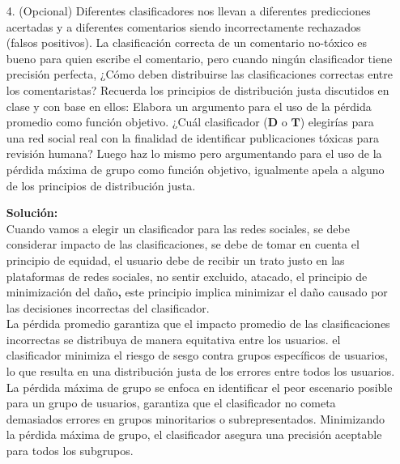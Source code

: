 \documentclass[11pt,letterpaper]{article}
\newenvironment{solution}{%
  \noindent\begin{shaded}
  \textbf{Solución:}\ }{
  \end{shaded}%
}
\begin{document}
\begin{enumerate}
¿Qué clasificador tiene la menor pérdida promedio? ¿Qué clasificador tiene la menor pérdida máxima de grupo?
  \begin{solution}
 
  \end{solution}

  \item [4.]
  (Opcional) Diferentes clasificadores nos llevan a diferentes predicciones acertadas y a diferentes comentarios siendo incorrectamente rechazados (falsos positivos). La clasificación correcta de un comentario no-tóxico es bueno para quien escribe el comentario, pero cuando ningún clasificador tiene precisión perfecta, ¿Cómo deben distribuirse las clasificaciones correctas entre los comentaristas? Recuerda los principios de distribución justa discutidos en clase y con base en ellos: Elabora un argumento para el uso de la pérdida promedio como función objetivo. ¿Cuál clasificador ($\mathbf{D}$ o $\mathbf{T}$) elegirías para una red social real con la finalidad de identificar publicaciones tóxicas para revisión humana? Luego haz lo mismo pero argumentando para el uso de la pérdida máxima de grupo como función objetivo, igualmente apela a alguno de los principios de distribución justa.
  \begin{solution}
 \\Cuando vamos a elegir un clasificador para las redes sociales, se debe considerar impacto de las clasificaciones, se debe de tomar en cuenta el principio de equidad, el usuario debe de recibir un trato justo en las plataformas de redes sociales, no sentir excluido, atacado, el principio de minimización del daño\textbf{, }este principio implica minimizar el daño causado por las decisiones incorrectas del clasificador.\\
La pérdida promedio garantiza que el impacto promedio de las clasificaciones incorrectas se distribuya de manera equitativa entre los usuarios. el clasificador minimiza el riesgo de sesgo contra grupos específicos de usuarios, lo que resulta en una distribución justa de los errores entre todos los usuarios.\\
La pérdida máxima de grupo se enfoca en identificar el peor escenario posible para un grupo de usuarios, garantiza que el clasificador no cometa demasiados errores en grupos minoritarios o subrepresentados. Minimizando la pérdida máxima de grupo, el clasificador asegura una precisión aceptable para todos los subgrupos.


  \end{solution}


\end{enumerate}
\end{document}
